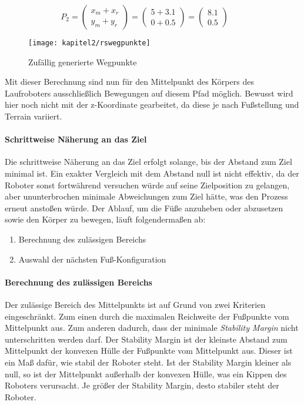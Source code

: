 \begin{equation}
  P_2=\left(\begin{array}{c} x_m + x_r \\ y_m + y_r \end{array}\right)=\left(\begin{array}{c} 5 + 3.1 \\ 0 + 0.5 \end{array}\right)=\left(\begin{array}{c} 8.1 \\ 0.5 \end{array}\right) \qquad
\label{RandomSamplingWegpunkteP2}
\end{equation}

\begin{figure}[t!]
  \centering
  \texttt{[image: kapitel2/rswegpunkte]}
  \caption{Zufällig generierte Wegpunkte}
  \label{Kap2:RSWegpunkte}
\end{figure}

Mit dieser Berechnung sind nun für den Mittelpunkt des Körpers des Laufroboters ausschließlich Bewegungen auf diesem Pfad möglich. Bewusst wird hier noch nicht mit der z-Koordinate gearbeitet, da diese je nach Fußstellung und Terrain variiert.

\paragraph{Schrittweise Näherung an das Ziel}

Die schrittweise Näherung an das Ziel erfolgt solange, bis der Abstand zum Ziel minimal ist. Ein exakter Vergleich mit dem Abstand null ist nicht effektiv, da der Roboter sonst fortwährend versuchen würde auf seine Zielposition zu gelangen, aber ununterbrochen minimale Abweichungen zum Ziel hätte, was den Prozess erneut anstoßen würde. Der Ablauf, um die Füße anzuheben oder abzusetzen sowie den Körper zu bewegen, läuft folgendermaßen ab:
\begin{enumerate}
  \item Berechnung des zulässigen Bereichs
  \item Auswahl der nächsten Fuß-Konfiguration
\end{enumerate}

\paragraph{Berechnung des zulässigen Bereichs}

Der zulässige Bereich des Mittelpunkts ist auf Grund von zwei Kriterien eingeschränkt. Zum einen durch die maximalen Reichweite der Fußpunkte vom Mittelpunkt aus. Zum anderen dadurch, dass der minimale \emph{Stability Margin} nicht unterschritten werden darf. Der Stability Margin ist der kleinste Abstand zum Mittelpunkt der konvexen Hülle der Fußpunkte vom Mittelpunkt aus. Dieser ist ein Maß dafür, wie stabil der Roboter steht. Ist der Stability Margin kleiner als null, so ist der Mittelpunkt außerhalb der konvexen Hülle, was ein Kippen des Roboters verursacht. Je größer der Stability Margin, desto stabiler steht der Roboter.

